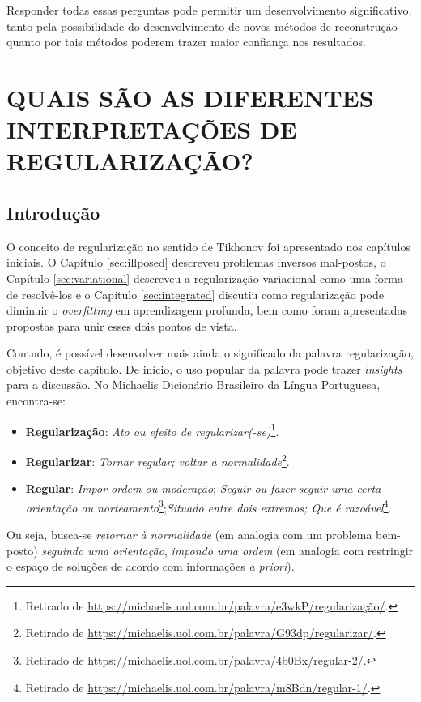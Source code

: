   Responder todas essas perguntas pode permitir um desenvolvimento significativo, tanto pela possibilidade do desenvolvimento de novos métodos de reconstrução quanto por tais métodos poderem trazer maior confiança nos resultados.


\newpage

\section{QUAIS SÃO AS DIFERENTES INTERPRETAÇÕES DE REGULARIZAÇÃO?}\label{sec:polysemy}

\subsection{Introdução}
O conceito de regularização no sentido de Tikhonov foi apresentado nos capítulos iniciais. O Capítulo \ref{sec:illposed} descreveu problemas inversos mal-postos, o Capítulo \ref{sec:variational} descreveu a regularização variacional como uma forma de resolvê-los e o Capítulo \ref{sec:integrated} discutiu como regularização pode diminuir o \textit{overfitting} em aprendizagem profunda, bem como foram apresentadas propostas para unir esses dois pontos de vista. 

Contudo, é possível desenvolver mais ainda o significado da palavra regularização, objetivo deste capítulo. De início, o uso popular da palavra pode trazer \textit{insights} para a discussão. No Michaelis Dicionário Brasileiro da Língua Portuguesa, encontra-se:
\begin{itemize}
		\item \textbf{Regularização}: \textit{Ato ou efeito de regularizar(-se)}\footnote{Retirado de \url{https://michaelis.uol.com.br/palavra/e3wkP/regularização/}.}.
	\item \textbf{Regularizar}: \textit{Tornar regular; voltar à normalidade}\footnote{Retirado de \url{https://michaelis.uol.com.br/palavra/G93dp/regularizar/}.}.
	\item \textbf{Regular}: \textit{Impor ordem ou moderação}; \textit{Seguir ou fazer seguir uma certa orientação ou norteamento}\footnote{Retirado de \url{https://michaelis.uol.com.br/palavra/4b0Bx/regular-2/}.};\textit{Situado entre dois extremos; Que é razoável}\footnote{Retirado de \url{https://michaelis.uol.com.br/palavra/m8Bdn/regular-1/}.}.
\end{itemize}
 Ou seja, busca-se \textit{retornar à normalidade} (em analogia com um problema bem-posto) \textit{seguindo uma orientação}, \textit{impondo uma ordem} (em analogia com restringir o espaço de soluções de acordo com informações \textit{a priori}). 

